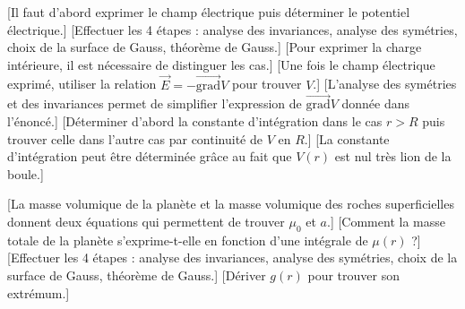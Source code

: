 

\begin{enumerate}
    [Il faut d'abord exprimer le champ électrique puis déterminer le potentiel électrique.]
    [Effectuer les 4 étapes : analyse des invariances, analyse des symétries, choix de la surface de Gauss, théorème de Gauss.]
    [Pour exprimer la charge intérieure, il est nécessaire de distinguer les cas.]
    [Une fois le champ électrique exprimé, utiliser la relation $\vec{E}=-\vec{\text{grad}}V$ pour trouver $V$.]
    [L'analyse des symétries et des invariances permet de simplifier l'expression de $\vec{\text{grad}}V$ donnée dans l'énoncé.]
    [Déterminer d'abord la constante d'intégration dans le cas $r\gt R$ puis trouver celle dans l'autre cas par continuité de $V$ en $R$.]
    [La constante d'intégration peut être déterminée grâce au fait que $V(r)$ est nul très lion de la boule.]
\end{enumerate}



\begin{enumerate}
    [La masse volumique de la planète et la masse volumique des roches superficielles donnent deux équations qui permettent de trouver $\mu_0$ et $a$.]
    [Comment la masse totale de la planète s'exprime-t-elle en fonction d'une intégrale de $\mu(r)$ ?]
    [Effectuer les 4 étapes : analyse des invariances, analyse des symétries, choix de la surface de Gauss, théorème de Gauss.]
    [Dériver $g(r)$ pour trouver son extrémum.]
\end{enumerate} 

